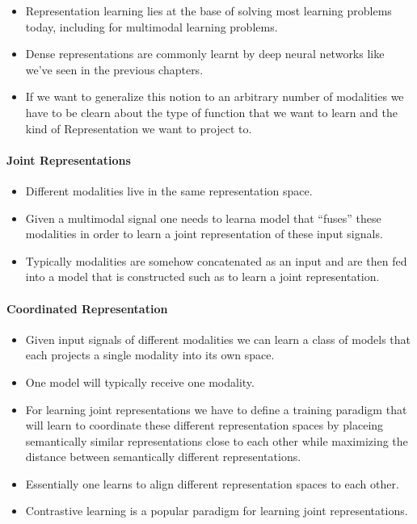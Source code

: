 \documentclass[
]{krantz}
\providecommand{\tightlist}{%
  \setlength{\itemsep}{0pt}\setlength{\parskip}{0pt}}
\begin{document}
\begin{itemize}
\tightlist
\item
  Representation learning lies at the base of solving most learning problems today, including for multimodal learning problems.
\item
  Dense representations are commonly learnt by deep neural networks like we've seen in the previous chapters.
\item
  If we want to generalize this notion to an arbitrary number of modalities we have to be clearn about the type of function that we want to learn and the kind of Representation we want to project to.
\end{itemize}

\hypertarget{joint-representations}{%
\paragraph{Joint Representations}\label{joint-representations}}

\begin{itemize}
\tightlist
\item
  Different modalities live in the same representation space.
\item
  Given a multimodal signal one needs to learna model that ``fuses'' these modalities in order to learn a joint representation of these input signals.
\item
  Typically modalities are somehow concatenated as an input and are then fed into a model that is constructed such as to learn a joint representation.
\end{itemize}

\hypertarget{coordinated-representation}{%
\paragraph{Coordinated Representation}\label{coordinated-representation}}

\begin{itemize}
\tightlist
\item
  Given input signals of different modalities we can learn a class of models that each projects a single modality into its own space.
\item
  One model will typically receive one modality.
\item
  For learning joint representations we have to define a training paradigm that will learn to coordinate these different representation spaces by placeing semantically similar representations close to each other while maximizing the distance between semantically different representations.
\item
  Essentially one learns to align different representation spaces to each other.
\item
  Contrastive learning is a popular paradigm for learning joint representations.
\end{itemize}
\end{document}
